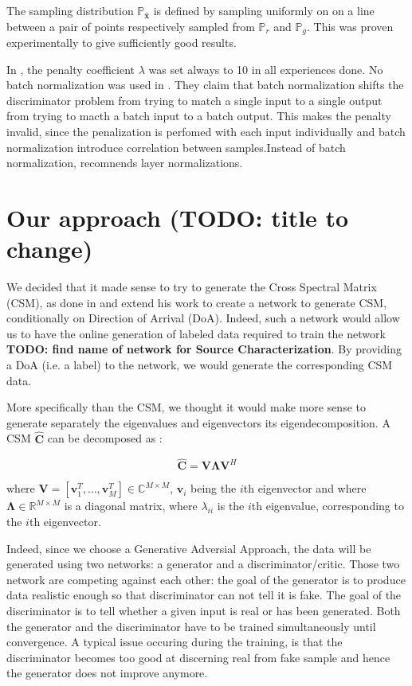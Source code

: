 \documentclass{article}
\begin{document}
The sampling distribution $\mathbb{P}_{\hat{\mathbf{x}}}$ is defined by sampling uniformly on on a line between a pair of points respectively sampled from $\mathbb{P}_{r}$ and $\mathbb{P}_{g}$. This was proven experimentally to give sufficiently good results.

In \cite{DBLP:journals/corr/GulrajaniAADC17}, the penalty coefficient $\lambda$ was set always to 10 in all experiences done. No batch normalization was used in \cite{DBLP:journals/corr/GulrajaniAADC17}. They claim that batch normalization shifts the discriminator problem from trying to match a single input to a single output from trying to macth a batch input to a batch output. This makes the penalty invalid, since the penalization is perfomed with each input individually and batch normalization introduce correlation between samples.Instead of batch normalization, \cite{DBLP:journals/corr/GulrajaniAADC17} recomnends layer normalizations.


\section{Our approach (TODO: title to change)}

We decided that it made sense to try to generate the Cross Spectral Matrix (CSM), as done in \cite{gerstoft2020parametric} and extend his work to create a network to generate CSM, conditionally on Direction of Arrival (DoA). Indeed, such a network would allow us to have the online generation of labeled data required to train the network \textbf{TODO: find name of network for Source Characterization}. By providing a DoA (i.e. a label) to the network, we would generate the corresponding CSM data.

More specifically than the CSM, we thought it would make more sense to generate separately the eigenvalues and eigenvectors its eigendecomposition. A CSM $\mathbf{\hat{C}}$ can be decomposed as :

\begin{equation}
    \mathbf{\hat{C}} = \mathbf{V} \mathbf{\Lambda} \mathbf{V}^H
\end{equation}

where $\mathbf{V} = [\mathbf{v}_1^T, \dots, \mathbf{v}_M^T] \in \mathbb{C}^{M \times M}$, $\mathbf{v}_i$ being the $i$th eigenvector and where $\mathbf{\Lambda} \in \mathbb{R}^{M \times M}$ is a diagonal matrix, where $\lambda_{ii}$ is the $i$th eigenvalue, corresponding to the $i$th eigenvector.

Indeed, since we choose a Generative Adversial Approach, the data will be generated using two networks: a generator and a discriminator/critic. Those two network are competing against each other: the goal of the generator is to produce data realistic enough so that discriminator can not tell it is fake. The goal of the discriminator is to tell whether a given input is real or has been generated. Both the generator and the discriminator have to be trained simultaneously until convergence. A typical issue occuring during the training, is that the discriminator becomes too good at discerning real from fake sample and hence the generator does not improve anymore.
\end{document}
